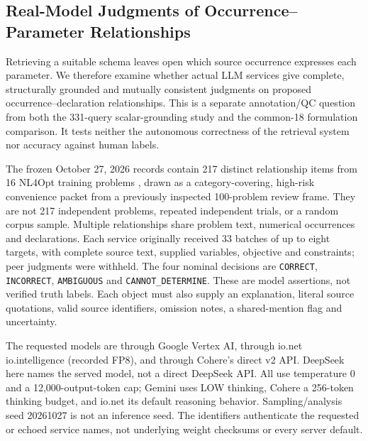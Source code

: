 \subsection{Real-Model Judgments of Occurrence--Parameter Relationships}
\label{subsec:relationship-audit}
Retrieving a suitable schema leaves open which source occurrence expresses each parameter. We therefore examine whether actual LLM services give complete, structurally grounded and mutually consistent judgments on proposed occurrence--declaration relationships. This is a separate annotation/QC question from both the 331-query scalar-grounding study and the common-18 formulation comparison. It tests neither the autonomous correctness of the retrieval system nor accuracy against human labels.

The frozen October 27, 2026 records contain 217 distinct relationship items from 16 NL4Opt training problems \cite{ramamonjison2023nl4opt}, drawn as a category-covering, high-risk convenience packet from a previously inspected 100-problem review frame. They are not 217 independent problems, repeated independent trials, or a random corpus sample. Multiple relationships share problem text, numerical occurrences and declarations. Each service originally received 33 batches of up to eight targets, with complete source text, supplied variables, objective and constraints; peer judgments were withheld. The four nominal decisions are \texttt{CORRECT}, \texttt{INCORRECT}, \texttt{AMBIGUOUS} and \texttt{CANNOT\_DETERMINE}. These are model assertions, not verified truth labels. Each object must also supply an explanation, literal source quotations, valid source identifiers, omission notes, a shared-mention flag and uncertainty.

The requested models are  through Google Vertex AI,  through io.net io.intelligence (recorded FP8), and  through Cohere's direct v2 API. DeepSeek here names the served model, not a direct DeepSeek API. All use temperature 0 and a 12,000-output-token cap; Gemini uses LOW thinking, Cohere a 256-token thinking budget, and io.net its default reasoning behavior. Sampling/analysis seed 20261027 is not an inference seed. The identifiers authenticate the requested or echoed service names, not underlying weight checksums or every server default.

